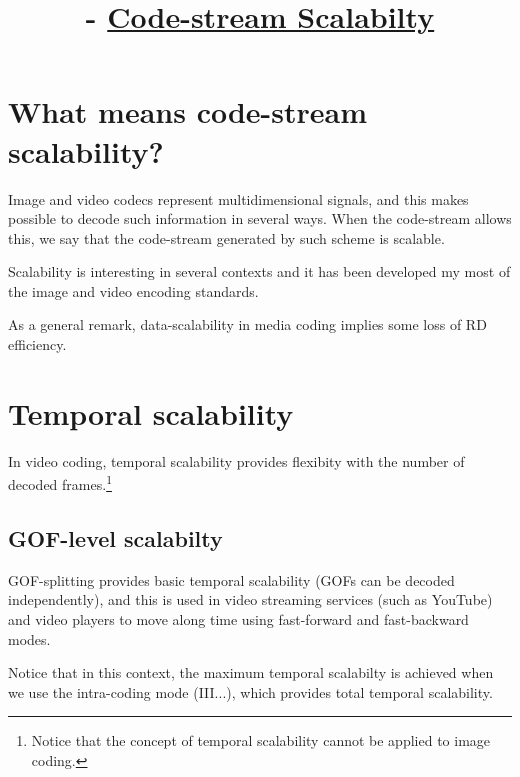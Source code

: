 



\title{\SM{} -  \href{https://github.com/Sistemas-Multimedia/Sistemas-Multimedia.github.io/tree/master/contents/data_scalability}{Code-stream Scalabilty}}

\maketitle
\tableofcontents

\section{What means code-stream scalability?}

Image and video codecs represent multidimensional signals, and this
makes possible to decode such information in several ways. When the
code-stream allows this, we say that the code-stream generated by such
scheme is scalable.

Scalability is interesting in several contexts and it has been
developed my most of the image and video encoding standards.

As a general remark, data-scalability in media coding implies some
loss of RD efficiency.


\section{Temporal scalability~\cite{vruiz__video_scalability}}


In video coding, temporal scalability provides flexibity with the
number of decoded frames.\footnote{Notice that the concept of temporal
scalability cannot be applied to image coding.}

\subsection{GOF-level scalabilty}
GOF-splitting provides basic temporal scalability (GOFs can be decoded
independently), and this is used in video streaming services (such as
YouTube) and video players to move along time using fast-forward and
fast-backward modes.
  
Notice that in this context, the maximum temporal scalabilty is
achieved when we use the intra-coding mode (III...), which provides
total temporal scalability.


